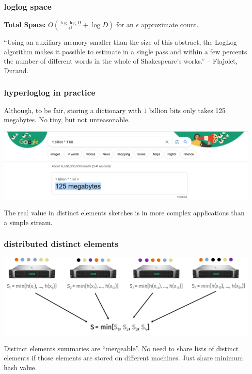 \documentclass[handout,compress]{beamer}
\begin{document}
\begin{frame}
	\frametitle{loglog space}
	\textbf{Total Space:} $O \left (\frac{\log \log D}{\epsilon^2} + \log D \right )$ for an $\epsilon$ approximate count.
	
	\small ``Using an auxiliary memory smaller than the size of this abstract, the LogLog algorithm makes it possible to estimate in a single pass and within a few percents the number of different words in the whole of Shakespeare’s works.'' -- Flajolet, Durand.
	
	
	\vspace{1em}
\end{frame}

\begin{frame}
	\frametitle{hyperloglog in practice}
	\begin{center} 
		Although, to be fair, storing a dictionary with $1$ billion bits only takes 125 megabytes. No tiny, but not unreasonable.
		
		\includegraphics[width=\textwidth]{google_bit_calculations.png}
	\end{center}
	The real value in distinct elements sketches is in more complex applications than a simple stream.
\end{frame}

\begin{frame}
	\frametitle{distributed distinct elements}
	\begin{center}
		\includegraphics[width=\textwidth]{dist_min_hash.png}
	\end{center}

	Distinct elements summaries are ``mergeable''. No need to share lists of distinct elements if those elements are stored on different machines. Just share minimum hash value.
\end{frame}
\end{document}
